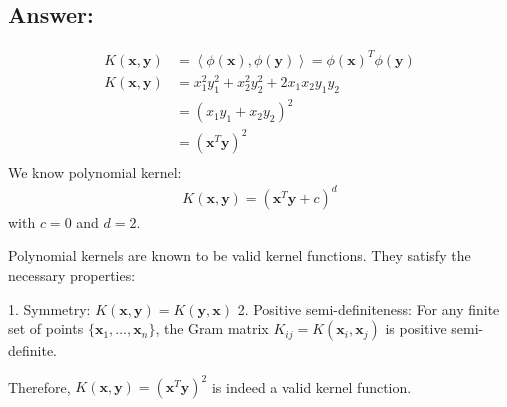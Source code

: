 \documentclass[a4paper,12pt]{article}
\begin{document}
\subsection*{Answer:}
\begin{align*}
    K(\bm{x}, \bm{y}) &= \left< \phi(\bm{x}),\phi(\bm{y})\right> = \phi(\bm{x})^T\phi(\bm{y}) \\
    K(\bm{x}, \bm{y}) &= x_1^2y_1^2 + x_2^2y_2^2 + 2x_1x_2y_1y_2 \\
    &= (x_1y_1 + x_2y_2)^2 \\
    &= (\bm{x}^T\bm{y})^2 \\
\end{align*}
We know polynomial kernel:
\begin{align*}
    K(\bm{x}, \bm{y}) = (\bm{x}^T\bm{y}+c)^d
\end{align*}
with \(c=0\) and \(d=2\).

Polynomial kernels are known to be valid kernel functions. They satisfy the necessary properties:

1. Symmetry: \(K(\bm{x}, \bm{y}) = K(\bm{y}, \bm{x})\)
2. Positive semi-definiteness: For any finite set of points \(\{\bm{x}_1, ..., \bm{x}_n\}\), the Gram matrix \(K_{ij} = K(\bm{x}_i, \bm{x}_j)\) is positive semi-definite.

Therefore, \(K(\bm{x}, \bm{y}) = (\bm{x}^T\bm{y})^2\) is indeed a valid kernel function.
\end{document}
